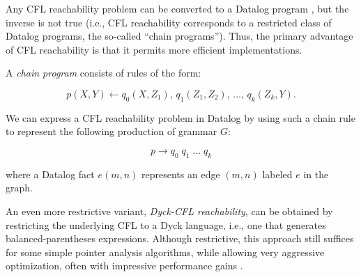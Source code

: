 Any CFL reachability problem can be converted to a Datalog program
\cite{journals/infsof/Reps98}, but the inverse is not true (i.e., CFL
reachability corresponds to a restricted class of Datalog programs,
the so-called ``chain programs''). Thus, the primary advantage of CFL
reachability is that it permits more efficient implementations.

A \emph{chain program} consists of rules of the form:

\[p(X, Y) \leftarrow q_0(X,Z_1),\, q_1(Z_1, Z_2),\, \dots,\, q_k(Z_k,
  Y). \]

We can express a CFL reachability problem in Datalog by using such a
chain rule to represent the following production of grammar \(G\):

\[p \rightarrow q_0\; q_1\; \dots\; q_k \]

where a Datalog fact \(e(m, n)\) represents an edge \((m, n)\) labeled
\(e\) in the graph.

An even more restrictive variant, \emph{Dyck-CFL reachability}, can be
obtained by restricting the underlying CFL to a Dyck language, i.e.,
one that generates balanced-parentheses expressions. Although
restrictive, this approach still suffices for some simple pointer
analysis algorithms, while allowing very aggressive optimization,
often with impressive performance gains \cite{pldi/ZhangLYS13}.



